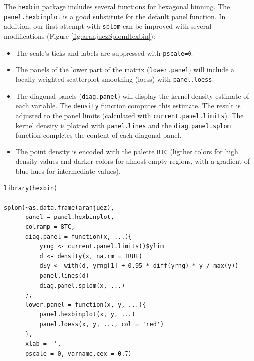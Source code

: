 \documentclass[smallroyalvopaper]{memoir}
\begin{document}
The \texttt{hexbin} package \cite{Carr.Lewin-Koh.ea2013} includes several
functions for hexagonal binning.  The \texttt{panel.hexbinplot} is a good
substitute for the default panel function. In addition, our first
attempt with \texttt{splom} can be improved with several modifications
(Figure \ref{fig:aranjuezSplomHexbin}):
\begin{itemize}
\item The scale's ticks and labels are suppressed with \texttt{pscale=0}.
\item The panels of the lower part of the matrix (\texttt{lower.panel}) will
include a locally weighted scatterplot smoothing (loess) with
\texttt{panel.loess}.
\item The diagonal panels (\texttt{diag.panel}) will display the kernel
density estimate of each variable. The \texttt{density} function
computes this estimate. The result is adjusted to the panel
limits (calculated with \texttt{current.panel.limits}). The kernel
density is plotted with \texttt{panel.lines} and the \texttt{diag.panel.splom}
function completes the content of each diagonal panel.
\item The point density is encoded with the palette \texttt{BTC} (ligther
colors for high density values and darker colors for almost
empty regions, with a gradient of blue hues for intermediate values).
\end{itemize}




\lstset{language=r,label= ,caption= ,captionpos=b,numbers=none}
\begin{lstlisting}
library(hexbin)
  
splom(~as.data.frame(aranjuez),
      panel = panel.hexbinplot,
      colramp = BTC,
      diag.panel = function(x, ...){
          yrng <- current.panel.limits()$ylim
          d <- density(x, na.rm = TRUE)
          d$y <- with(d, yrng[1] + 0.95 * diff(yrng) * y / max(y))
          panel.lines(d)
          diag.panel.splom(x, ...)
      },
      lower.panel = function(x, y, ...){
          panel.hexbinplot(x, y, ...)
          panel.loess(x, y, ..., col = 'red')
      },
      xlab = '',
      pscale = 0, varname.cex = 0.7)
\end{lstlisting}
\end{document}
